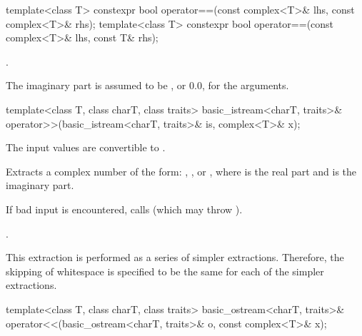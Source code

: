 %
\begin{itemdecl}
template<class T> constexpr bool operator==(const complex<T>& lhs, const complex<T>& rhs);
template<class T> constexpr bool operator==(const complex<T>& lhs, const T& rhs);
\end{itemdecl}

\begin{itemdescr}
\pnum
\returns
{}.

\pnum
\remarks
The imaginary part is assumed to be
,
or 0.0, for the
arguments.
\end{itemdescr}

%
\begin{itemdecl}
template<class T, class charT, class traits>
  basic_istream<charT, traits>& operator>>(basic_istream<charT, traits>& is, complex<T>& x);
\end{itemdecl}

\begin{itemdescr}
\pnum
\expects
The input values are convertible to
.

\pnum
\effects
Extracts a complex number  of the form:
,
,
or
,
where
is the real part and
is the imaginary part.

\pnum
If bad input is encountered, calls
(which may throw
).

\pnum
\returns
{}.

\pnum
\remarks
This extraction is performed as a series of simpler
extractions.
Therefore, the skipping of whitespace is specified to be
the same for each of the simpler extractions.
\end{itemdescr}

%
\begin{itemdecl}
template<class T, class charT, class traits>
  basic_ostream<charT, traits>& operator<<(basic_ostream<charT, traits>& o, const complex<T>& x);
\end{itemdecl}

